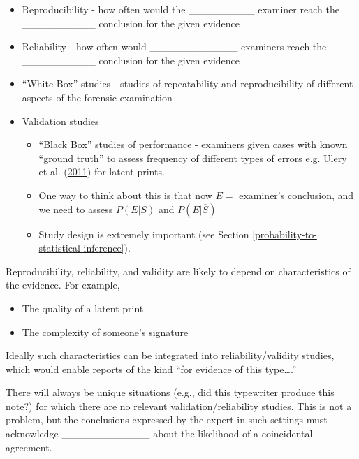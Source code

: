 \documentclass[]{book}
\providecommand{\tightlist}{%
  \setlength{\itemsep}{0pt}\setlength{\parskip}{0pt}}
\theoremstyle{definition}
\theoremstyle{definition}
\theoremstyle{remark}
\begin{document}
\begin{itemize}
\tightlist
\item
  Reproducibility - how often would the \_\_\_\_\_\_\_\_\_ examiner
  reach the \_\_\_\_\_\_\_\_\_\_ conclusion for the given evidence
  \vspace{.1in}
\item
  Reliability - how often would \_\_\_\_\_\_\_\_\_\_\_\_ examiners reach
  the \_\_\_\_\_\_\_\_\_\_ conclusion for the given evidence
  \vspace{.1in}
\item
  ``White Box'' studies - studies of repeatability and reproducibility
  of different aspects of the forensic examination
\item
  Validation studies

  \begin{itemize}
  \tightlist
  \item
    ``Black Box'' studies of performance - examiners given cases with
    known ``ground truth'' to assess frequency of different types of
    errors e.g. Ulery et al. (\protect\hyperlink{ref-uleryetal}{2011})
    for latent prints.
  \item
    One way to think about this is that now \(E=\) examiner's
    conclusion, and we need to assess \(P(E|S)\) and
    \(P(E|\overline{S})\)
  \item
    Study design is extremely important (see Section
    \ref{probability-to-statistical-inference}).
  \end{itemize}
\end{itemize}

Reproducibility, reliability, and validity are likely to depend on
characteristics of the evidence. For example,

\begin{itemize}
\tightlist
\item
  The quality of a latent print
\item
  The complexity of someone's signature
\end{itemize}

Ideally such characteristics can be integrated into reliability/validity
studies, which would enable reports of the kind ``for evidence of this
type\ldots{}.''

There will always be unique situations (e.g., did this typewriter
produce this note?) for which there are no relevant
validation/reliability studies. This is not a problem, but the
conclusions expressed by the expert in such settings must acknowledge
\_\_\_\_\_\_\_\_\_\_\_\_ about the likelihood of a coincidental
agreement.
\end{document}
